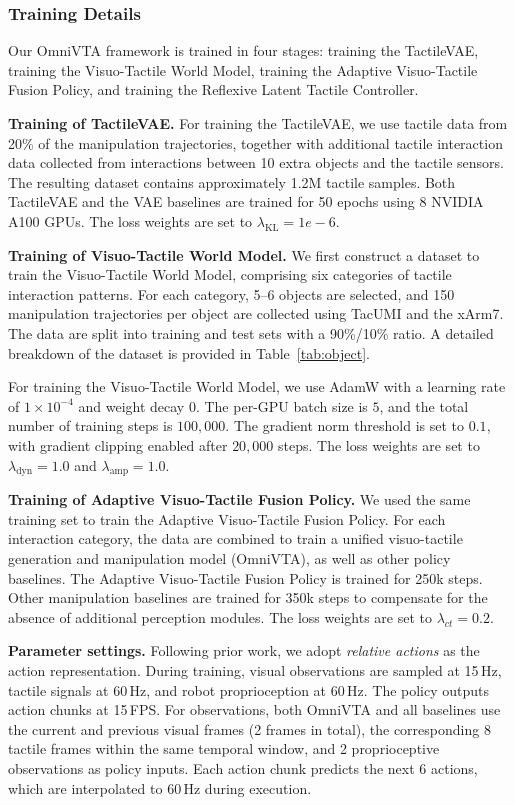 \subsubsection{Training Details}
Our OmniVTA framework is trained in four stages: training the TactileVAE, training the Visuo-Tactile World Model, training the Adaptive Visuo-Tactile Fusion Policy, and training the Reflexive Latent Tactile Controller.

\noindent\textbf{Training of TactileVAE.}
For training the TactileVAE, we use tactile data from 20\% of the manipulation trajectories, together with additional tactile interaction data collected from interactions between 10 extra objects and the tactile sensors. The resulting dataset contains approximately 1.2M tactile samples. 
Both TactileVAE and the VAE baselines are trained for 50 epochs using 8 NVIDIA A100 GPUs.
The loss weights are set to $\lambda_{\text{KL}}=1e-6$.

\noindent\textbf{Training of Visuo-Tactile World Model.}
We first construct a dataset to train the Visuo-Tactile World Model, comprising six categories of tactile interaction patterns. 
For each category, 5--6 objects are selected, and 150 manipulation trajectories per object are collected using TacUMI and the xArm7. 
The data are split into training and test sets with a 90\%/10\% ratio. 
A detailed breakdown of the dataset is provided in Table~\ref{tab:object}.

For training the Visuo-Tactile World Model, we use AdamW with a learning rate of $1\times10^{-4}$ and weight decay $0$. The per-GPU batch size is $5$, and the total number of training steps is $100{,}000$. The gradient norm threshold is set to $0.1$, with gradient clipping enabled after $20{,}000$ steps. The loss weights are set to $\lambda_{\text{dyn}}=1.0$ and $\lambda_{\text{amp}}=1.0$.

\noindent\textbf{Training of Adaptive Visuo-Tactile Fusion Policy.}
We used the same training set to train the Adaptive Visuo-Tactile Fusion Policy.
For each interaction category, the data are combined to train a unified visuo-tactile generation and manipulation model (OmniVTA), as well as other policy baselines. 
The Adaptive Visuo-Tactile Fusion Policy is trained for 250k steps. Other manipulation baselines are trained for 350k steps to compensate for the absence of additional perception modules.
The loss weights are set to $\lambda_{ct}=0.2$.

\noindent\textbf{Parameter settings.}
Following prior work, we adopt \emph{relative actions} as the action representation. 
During training, visual observations are sampled at 15\,Hz, tactile signals at 60\,Hz, and robot proprioception at 60\,Hz. 
The policy outputs action chunks at 15\,FPS. 
For observations, both OmniVTA and all baselines use the current and previous visual frames (2 frames in total), the corresponding 8 tactile frames within the same temporal window, and 2 proprioceptive observations as policy inputs. 
Each action chunk predicts the next 6 actions, which are interpolated to 60\,Hz during execution.

